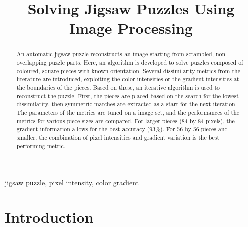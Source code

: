 \documentclass[conference,english, 12pt,a4paper]{IEEEtran}
\begin{document}
%
\title{Solving Jigsaw Puzzles Using Image Processing}


\author{
\and
{}
\and
{}
}

\maketitle
\thispagestyle{plain}
\pagestyle{plain}


\begin{abstract}
    An automatic jigsaw puzzle reconstructs an image starting from scrambled, non-overlapping puzzle parts. Here, an algorithm is developed to solve puzzles composed of coloured, square pieces with known orientation. Several dissimilarity metrics from the literature are introduced, exploiting the color intensities or the gradient intensities at the boundaries of the pieces. Based on these, an iterative algorithm is used to reconstruct the puzzle. First, the pieces are placed based on the search for the lowest dissimilarity, then symmetric matches are extracted as a start for the next iteration. The parameters of the metrics are tuned on a image set, and the performances of the metrics for various piece sizes are compared. For larger pieces (84 by 84 pixels), the gradient information allows for the best accuracy (93\%). For 56 by 56 pieces and smaller, the combination of pixel intensities and gradient variation is the best performing metric.
\end{abstract}

\begin{IEEEkeywords}
jigsaw puzzle, pixel intensity, color gradient 
\end{IEEEkeywords}

\IEEEpeerreviewmaketitle


\section{Introduction}

\end{document}

